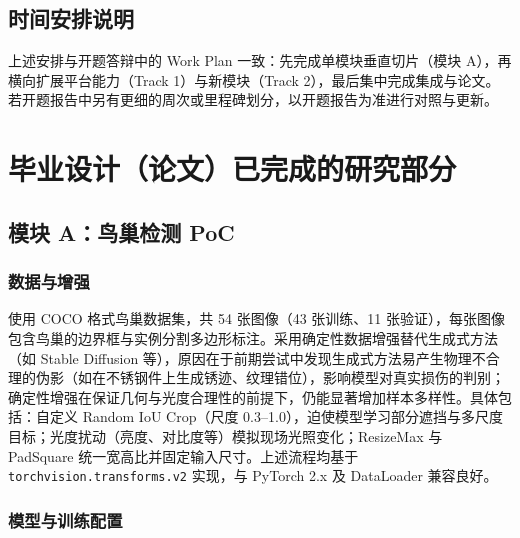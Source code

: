 \documentclass[12pt,a4paper]{article}
\begin{document}
\subsection{时间安排说明}

上述安排与开题答辩中的 Work Plan 一致：先完成单模块垂直切片（模块 A），再横向扩展平台能力（Track 1）与新模块（Track 2），最后集中完成集成与论文。若开题报告中另有更细的周次或里程碑划分，以开题报告为准进行对照与更新。


\section{毕业设计（论文）已完成的研究部分}

\subsection{模块 A：鸟巢检测 PoC}

\subsubsection{数据与增强}

使用 COCO 格式鸟巢数据集，共 54 张图像（43 张训练、11 张验证），每张图像包含鸟巢的边界框与实例分割多边形标注。采用确定性数据增强替代生成式方法（如 Stable Diffusion 等），原因在于前期尝试中发现生成式方法易产生物理不合理的伪影（如在不锈钢件上生成锈迹、纹理错位），影响模型对真实损伤的判别；确定性增强在保证几何与光度合理性的前提下，仍能显著增加样本多样性。具体包括：自定义 Random IoU Crop（尺度 0.3--1.0），迫使模型学习部分遮挡与多尺度目标；光度扰动（亮度、对比度等）模拟现场光照变化；ResizeMax 与 PadSquare 统一宽高比并固定输入尺寸。上述流程均基于 \texttt{torchvision.transforms.v2} 实现，与 PyTorch 2.x 及 DataLoader 兼容良好。

\subsubsection{模型与训练配置}
\end{document}
